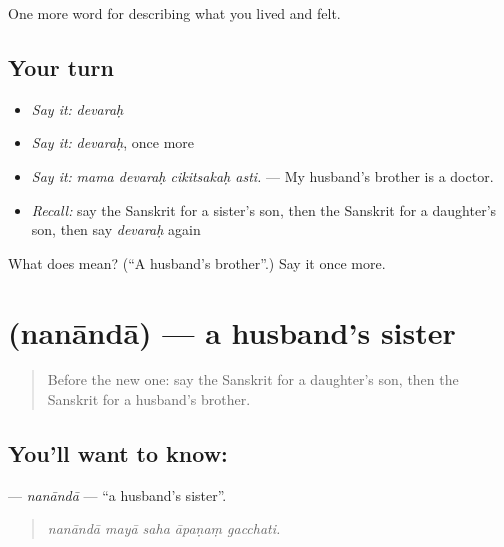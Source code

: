 \begin{grammarlens}[title={What you've built}]
One more word for describing what you lived and felt.
\end{grammarlens}

\subsection*{Your turn}
\begin{itemize}
\raggedright
  \item \emph{Say it:} \emph{devaraḥ}
  \item \emph{Say it:} \emph{devaraḥ}, once more
  \item \emph{Say it:} \emph{mama devaraḥ cikitsakaḥ asti.} — My husband's brother is a doctor.
  \item \emph{Recall:} say the Sanskrit for a sister's son, then the Sanskrit for a daughter's son, then say \emph{devaraḥ} again
\end{itemize}

\begin{tcolorbox}[breakable,colback=teal!4,colframe=teal!35!black,title={Before you move on}]
What does  mean? (\textquotedblleft{}A husband's brother\textquotedblright{}.) Say it once more.
\end{tcolorbox}
\section[\texorpdfstring{\sk{ननान्दा} (nanāndā)}{ननान्दा (nanāndā)}]{ (nanāndā) — a husband's sister}

\label{lesson:SA-C500-nananda}



\begin{quote}
Before the new one: say the Sanskrit for a daughter's son, then the Sanskrit for a husband's brother.
\end{quote}

\subsection*{You'll want to know: }
\textbf{} — \emph{nanāndā} — \textquotedblleft{}a husband's sister\textquotedblright{}.

\begin{quote}
    
\end{quote}

\begin{quote}
\emph{nanāndā mayā saha āpaṇaṃ gacchati.}
\end{quote}

